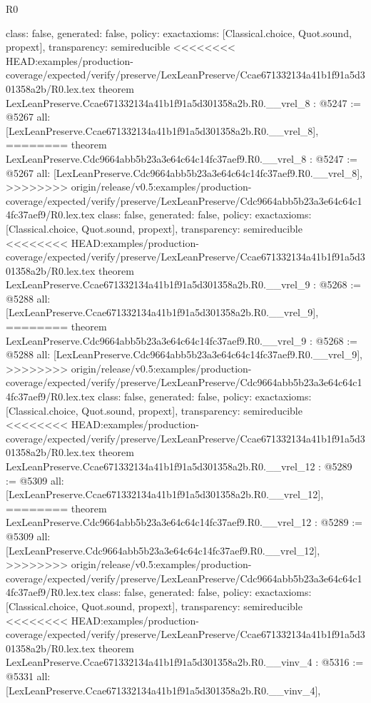 \begin{lexlean}{R0}
\begin{coremodule}
{{{{{{{{{{{{{{{{{{{{{{{{{{{{{{{{{{{{{{{{{{{{{{{{{{{{{{{{{{{{{{{{{{{{{{{  class: false,
  generated: false,
  policy: exact{axioms: [Classical.choice, Quot.sound, propext]},
  transparency: semireducible
}
<<<<<<<< HEAD:examples/production-coverage/expected/verify/preserve/LexLeanPreserve/Ccae671332134a41b1f91a5d301358a2b/R0.lex.tex
theorem LexLeanPreserve.Ccae671332134a41b1f91a5d301358a2b.R0.__vrel_8 : @5247 := @5267 {
  all: [LexLeanPreserve.Ccae671332134a41b1f91a5d301358a2b.R0.__vrel_8],
========
theorem LexLeanPreserve.Cdc9664abb5b23a3e64c64c14fc37aef9.R0.__vrel_8 : @5247 := @5267 {
  all: [LexLeanPreserve.Cdc9664abb5b23a3e64c64c14fc37aef9.R0.__vrel_8],
>>>>>>>> origin/release/v0.5:examples/production-coverage/expected/verify/preserve/LexLeanPreserve/Cdc9664abb5b23a3e64c64c14fc37aef9/R0.lex.tex
  class: false,
  generated: false,
  policy: exact{axioms: [Classical.choice, Quot.sound, propext]},
  transparency: semireducible
}
<<<<<<<< HEAD:examples/production-coverage/expected/verify/preserve/LexLeanPreserve/Ccae671332134a41b1f91a5d301358a2b/R0.lex.tex
theorem LexLeanPreserve.Ccae671332134a41b1f91a5d301358a2b.R0.__vrel_9 : @5268 := @5288 {
  all: [LexLeanPreserve.Ccae671332134a41b1f91a5d301358a2b.R0.__vrel_9],
========
theorem LexLeanPreserve.Cdc9664abb5b23a3e64c64c14fc37aef9.R0.__vrel_9 : @5268 := @5288 {
  all: [LexLeanPreserve.Cdc9664abb5b23a3e64c64c14fc37aef9.R0.__vrel_9],
>>>>>>>> origin/release/v0.5:examples/production-coverage/expected/verify/preserve/LexLeanPreserve/Cdc9664abb5b23a3e64c64c14fc37aef9/R0.lex.tex
  class: false,
  generated: false,
  policy: exact{axioms: [Classical.choice, Quot.sound, propext]},
  transparency: semireducible
}
<<<<<<<< HEAD:examples/production-coverage/expected/verify/preserve/LexLeanPreserve/Ccae671332134a41b1f91a5d301358a2b/R0.lex.tex
theorem LexLeanPreserve.Ccae671332134a41b1f91a5d301358a2b.R0.__vrel_12 : @5289 := @5309 {
  all: [LexLeanPreserve.Ccae671332134a41b1f91a5d301358a2b.R0.__vrel_12],
========
theorem LexLeanPreserve.Cdc9664abb5b23a3e64c64c14fc37aef9.R0.__vrel_12 : @5289 := @5309 {
  all: [LexLeanPreserve.Cdc9664abb5b23a3e64c64c14fc37aef9.R0.__vrel_12],
>>>>>>>> origin/release/v0.5:examples/production-coverage/expected/verify/preserve/LexLeanPreserve/Cdc9664abb5b23a3e64c64c14fc37aef9/R0.lex.tex
  class: false,
  generated: false,
  policy: exact{axioms: [Classical.choice, Quot.sound, propext]},
  transparency: semireducible
}
<<<<<<<< HEAD:examples/production-coverage/expected/verify/preserve/LexLeanPreserve/Ccae671332134a41b1f91a5d301358a2b/R0.lex.tex
theorem LexLeanPreserve.Ccae671332134a41b1f91a5d301358a2b.R0.__vinv_4 : @5316 := @5331 {
  all: [LexLeanPreserve.Ccae671332134a41b1f91a5d301358a2b.R0.__vinv_4],
}}}}}}}}}}}}}}}}}}}}}}}}}}}}}}}}}}}}}}}}}}}}}}}}}}}}}}}}}}}}}}}}}}}}}}}}}}
\end{coremodule}
\end{lexlean}
